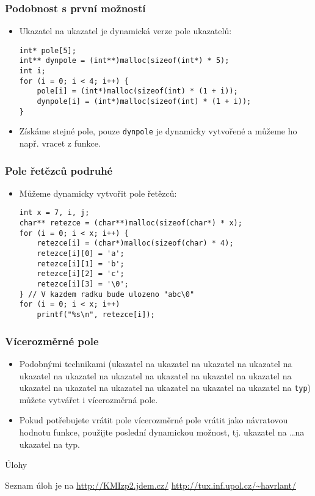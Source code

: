 \documentclass{beamer}
\newenvironment{itemizex}%
  {\large \begin{itemize}%
    \setlength{\itemsep}{8pt}%
    \setlength{\parskip}{8pt}}%
  {\end{itemize}}
\begin{document}
\begin{frame}[t,fragile]\frametitle{Podobnost s první možností} 
    \begin{itemizex}
        \item Ukazatel na ukazatel je dynamická verze pole ukazatelů:
\begin{verbatim} 
int* pole[5];
int** dynpole = (int**)malloc(sizeof(int*) * 5);
int i;
for (i = 0; i < 4; i++) {
    pole[i] = (int*)malloc(sizeof(int) * (1 + i));
    dynpole[i] = (int*)malloc(sizeof(int) * (1 + i));
}
\end{verbatim}
        \item Získáme stejné pole, pouze \texttt{dynpole} je dynamicky vytvořené a můžeme ho např. vracet z funkce.
    \end{itemizex}
\end{frame}



\begin{frame}[t,fragile]\frametitle{Pole řetězců podruhé} 
    \begin{itemizex}
        \item Můžeme dynamicky vytvořit pole řetězců:
\begin{verbatim} 
int x = 7, i, j;
char** retezce = (char**)malloc(sizeof(char*) * x);
for (i = 0; i < x; i++) {
    retezce[i] = (char*)malloc(sizeof(char) * 4);
    retezce[i][0] = 'a'; 
    retezce[i][1] = 'b'; 
    retezce[i][2] = 'c'; 
    retezce[i][3] = '\0';
} // V kazdem radku bude ulozeno "abc\0"
for (i = 0; i < x; i++)
    printf("%s\n", retezce[i]);
\end{verbatim}
    \end{itemizex}
\end{frame}


\begin{frame}[t,fragile]\frametitle{Vícerozměrné pole} 
    \begin{itemizex}
        \item Podobnými technikami (ukazatel na ukazatel na ukazatel na ukazatel na ukazatel na ukazatel na ukazatel na ukazatel na ukazatel na ukazatel na ukazatel na ukazatel na ukazatel na ukazatel na ukazatel na ukazatel na \texttt{typ}) můžete vytvářet i vícerozměrná pole.
        \item Pokud potřebujete vrátit pole vícerozměrné pole vrátit jako návratovou hodnotu funkce, použijte poslední dynamickou možnost, tj. ukazatel na \dots na ukazatel na typ. 
    \end{itemizex}
\end{frame}


\begin{frame}[t,fragile]{Úlohy}
\begin{center}
\vskip 1cm
{\Large Seznam úloh je na \url{http://KMIzp2.jdem.cz/}}
\vskip 2cm
\url{http://tux.inf.upol.cz/~havrlant/}
\end{center}
\end{frame}
\end{document}
